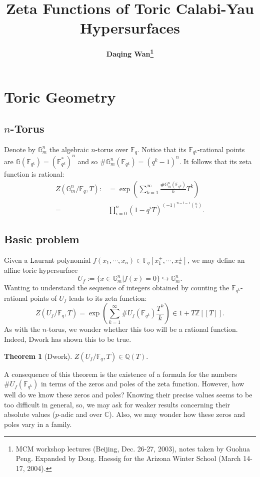 \documentclass[a4paper,oneside,11pt]{article}
\theoremstyle{plain} \theoremstyle{definition}
\newtheorem{Thm}{Theorem}[section]
\theoremstyle{remark}
\def\bb #1{ {\mathbb #1} }
\newcommand{\Z}{\mathbb{Z}}
\newcommand{\Q}{\mathbb{Q}}
\newcommand{\f}{\mathbb{F}}
\begin{document}
\title{ \Large \bf Zeta Functions of Toric Calabi-Yau Hypersurfaces}
\author{\large \bf Daqing Wan\footnote{MCM workshop lectures (Beijing, Dec. 26-27, 2003), notes taken by Guohua Peng. Expanded by Doug. Haessig for the Arizona Winter School (March 14-17, 2004).}}
\maketitle

\tableofcontents

\section{Toric Geometry}
\subsection{$n$-Torus}
Denote by $\mathbb{G}_m^n$ the algebraic $n$-torus over $\f_q$.
Notice that its $\bb F_{q^k}$-rational points are $\bb
G(\f_{q^k})=(\f_{q^k}^*)^n$ and so $\# \bb G_m^n(\f_{q^k})
=(q^k-1)^n$. It follows that its zeta function is rational:
\begin{align*}
Z(\mathbb{G}_m^n/\f_q, T) :&= \exp( \sum_{k=1}^\infty
\frac{\# \mathbb{G}_m^n(\f_{q^k})}{k} T^k ) \\
=&\prod_{i=0}^n (1-q^iT)^{(-1)^{n-i-1}{n\choose i}}.
\end{align*}

\subsection{Basic problem}
Given a Laurant polynomial $f(x_1,\cdots,x_n) \in
\f_q[x_1^\pm,\cdots,x_n^\pm]$, we may define an affine toric
hypersurface
\[
U_f := \{ x \in \bb G_m^n | f(x) =0 \} \hookrightarrow
\mathbb{G}_m^n.
\]
Wanting to understand the sequence of integers obtained by
counting the $\bb F_{q^k}$-rational points of $U_f$ leads to its
zeta function:
\[
Z(U_f / \f_q, T) = \exp( \sum_{k=1}^\infty
\#U_f(\f_{q^k})\frac{T^k}{k})\in 1+T\Z[[T]].
\]
As with the $n$-torus, we wonder whether this too will be a
rational function. Indeed, Dwork has shown this to be true.

\begin{Thm}[Dwork]
$Z(U_f/\f_q, T) \in \Q (T)$.
\end{Thm}

A consequence of this theorem is the existence of a formula for
the numbers $\#U_f(\f_{q^k})$ in terms of the zeros and poles of
the zeta function. However, how well do we know these zeros and
poles? Knowing their precise values seems to be too difficult in
general, so, we may ask for weaker results concerning their
absolute values ($p$-adic and over $\bb C$). Also, we
may wonder how these zeros and poles vary in a family.
\end{document}
